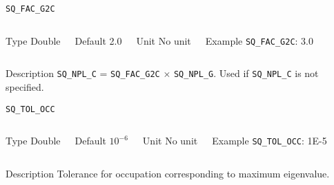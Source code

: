 \begin{frame}[allowframebreaks]{\texttt{{SQ\_FAC\_G2C}}} \label{SQ_FAC_G2C}
\vspace*{-12pt}
\begin{columns}
\begin{block}{Type}
Double
\end{block}

\begin{block}{Default}
2.0
\end{block}

\begin{block}{Unit}
No unit
\end{block}

\begin{block}{Example}
\texttt{SQ\_FAC\_G2C}: 3.0
\end{block}
\end{columns}

\begin{block}{Description}
\texttt{SQ\_NPL\_C} = \texttt{SQ\_FAC\_G2C} $\times$ \texttt{SQ\_NPL\_G}. Used if \texttt{SQ\_NPL\_C} is not specified.
\end{block}

\end{frame}


\begin{frame}[allowframebreaks]{\texttt{SQ\_TOL\_OCC}} \label{SQ_TOL_OCC}
\vspace*{-12pt}
\begin{columns}
\begin{block}{Type}
Double
\end{block}

\begin{block}{Default}
$10^{-6}$
\end{block}

\begin{block}{Unit}
No unit
\end{block}

\begin{block}{Example}
\texttt{SQ\_TOL\_OCC}: 1E-5
\end{block}
\end{columns}

\begin{block}{Description}
Tolerance for occupation corresponding to maximum eigenvalue.
\end{block}

\end{frame}




